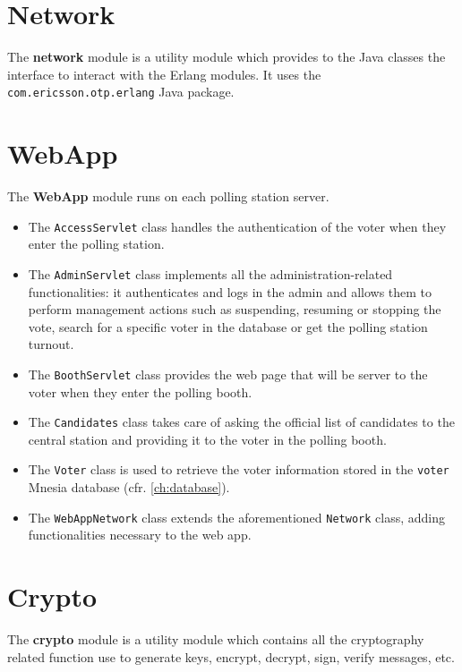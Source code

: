 \section*{Network}\label{sec:network}
The \textbf{network} module is a utility module which provides to the Java classes the interface to interact with the Erlang modules. It uses the \texttt{com.ericsson.otp.erlang} Java package.

\section*{WebApp}\label{sec:webapp}
The \textbf{WebApp} module runs on each polling station server. 
\begin{itemize}
	\item The \texttt{AccessServlet} class handles the authentication of the voter when they enter the polling station.
	\item The \texttt{AdminServlet} class implements all the administration-related functionalities: it authenticates and logs in the admin and allows them to perform management actions such as suspending, resuming or stopping the vote, search for a specific voter in the database or get the polling station turnout.
	\item The \texttt{BoothServlet} class provides the web page that will be server to the voter when they enter the polling booth.
	\item The \texttt{Candidates} class takes care of asking the official list of candidates to the central station and providing it to the voter in the polling booth.
	\item The \texttt{Voter} class is used to retrieve the voter information stored in the \texttt{voter} Mnesia database (cfr. \ref{ch:database}).
	\item The \texttt{WebAppNetwork} class extends the aforementioned \texttt{Network} class, adding functionalities necessary to the web app.
\end{itemize}

\section*{Crypto}\label{sec:crypto}
The \textbf{crypto} module is a utility module which contains all the cryptography related function use to generate keys, encrypt, decrypt, sign, verify messages, etc.